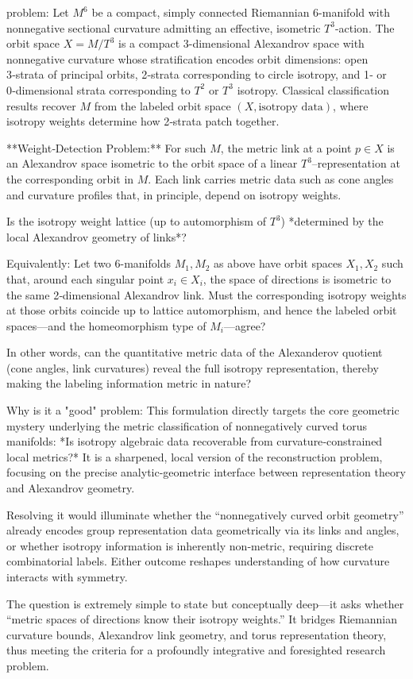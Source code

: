 problem:  
Let \(M^6\) be a compact, simply connected Riemannian \(6\)-manifold with nonnegative sectional curvature admitting an effective, isometric \(T^3\)-action. The orbit space \(X=M/T^3\) is a compact \(3\)-dimensional Alexandrov space with nonnegative curvature whose stratification encodes orbit dimensions: open 3‑strata of principal orbits, 2‑strata corresponding to circle isotropy, and 1‑ or 0‑dimensional strata corresponding to \(T^2\) or \(T^3\) isotropy. Classical classification results recover \(M\) from the labeled orbit space \((X,\text{isotropy data})\), where isotropy weights determine how 2‑strata patch together.

**Weight‑Detection Problem:**  
For such \(M\), the metric link at a point \(p\in X\) is an Alexandrov space isometric to the orbit space of a linear \(T^3\)–representation at the corresponding orbit in \(M\). Each link carries metric data such as cone angles and curvature profiles that, in principle, depend on isotropy weights.  

Is the isotropy weight lattice (up to automorphism of \(T^3\)) *determined by the local Alexandrov geometry of links*?  

Equivalently:  
Let two \(6\)-manifolds \(M_1,M_2\) as above have orbit spaces \(X_1, X_2\) such that, around each singular point \(x_i\in X_i\), the space of directions is isometric to the same 2‑dimensional Alexandrov link. Must the corresponding isotropy weights at those orbits coincide up to lattice automorphism, and hence the labeled orbit spaces—and the homeomorphism type of \(M_i\)—agree?  

In other words, can the quantitative metric data of the Alexanderov quotient (cone angles, link curvatures) reveal the full isotropy representation, thereby making the labeling information metric in nature?

Why is it a "good" problem:  
This formulation directly targets the core geometric mystery underlying the metric classification of nonnegatively curved torus manifolds: *Is isotropy algebraic data recoverable from curvature‑constrained local metrics?* It is a sharpened, local version of the reconstruction problem, focusing on the precise analytic-geometric interface between representation theory and Alexandrov geometry.  

Resolving it would illuminate whether the “nonnegatively curved orbit geometry” already encodes group representation data geometrically via its links and angles, or whether isotropy information is inherently non‑metric, requiring discrete combinatorial labels. Either outcome reshapes understanding of how curvature interacts with symmetry.  

The question is extremely simple to state but conceptually deep—it asks whether “metric spaces of directions know their isotropy weights.” It bridges Riemannian curvature bounds, Alexandrov link geometry, and torus representation theory, thus meeting the criteria for a profoundly integrative and foresighted research problem.